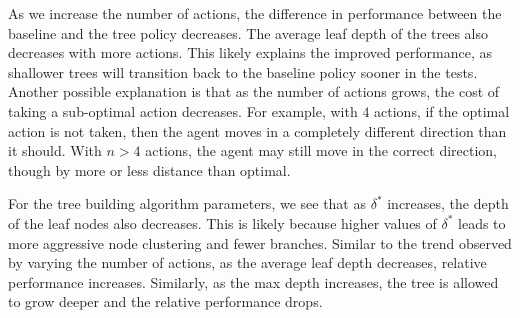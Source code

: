 \documentclass[letterpaper]{article} %
\begin{document}
As we increase the number of actions, the difference in performance between the baseline and the tree policy decreases.
The average leaf depth of the trees also decreases with more actions.
This likely explains the improved performance, as shallower trees will transition back to the baseline policy sooner in the tests.
Another possible explanation is that as the number of actions grows, the cost of taking a sub-optimal action decreases.
For example, with $4$ actions, if the optimal action is not taken, then the agent moves in a completely different direction than it should.
With $n>4$ actions, the agent may still move in the correct direction, though by more or less distance than optimal.

For the tree building algorithm parameters, we see that as $\delta^*$ increases, the depth of the leaf nodes also decreases.
This is likely because higher values of $\delta^*$ leads to more aggressive node clustering and fewer branches.
Similar to the trend observed by varying the number of actions, as the average leaf depth decreases, relative performance increases.
Similarly, as the max depth increases, the tree is allowed to grow deeper and the relative performance drops.
\end{document}
